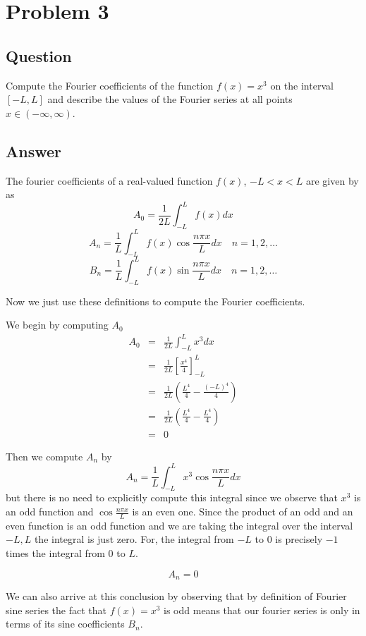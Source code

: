 \documentclass[12pt]{article}
\begin{document}
\section{Problem 3}
\subsection{Question}
Compute the Fourier coefficients of the function $f(x)=x^3$ on the interval $[-L,L]$ and describe the values of the Fourier series at all points $x\in(-\infty,\infty)$.

\subsection{Answer}

The fourier coefficients of a real-valued function $f(x)$, $-L<x<L$ are given by \cite[Page 37]{pinsky} as
\[A_0 = \frac{1}{2 L} \int_{-L}^L f(x) dx \]
\[A_n = \frac{1}{L} \int_{-L}^L f(x) \cos{\frac{n \pi x}{L}} dx \quad  n=1,2,\dots\]
\[B_n = \frac{1}{L} \int_{-L}^L f(x) \sin{\frac{n \pi x}{L}} dx \quad n=1,2,\dots \]

Now we just use these definitions to compute the Fourier coefficients.

We begin by computing $A_0$
\begin{eqnarray*}A_0 &=& \frac{1}{2 L} \int_{-L}^L x^3 dx \\
&=& \frac{1}{2L} \left[\frac{x^4}{4}\right]_{-L}^L \\
&=& \frac{1}{2L} \left(\frac{L^4}{4}-\frac{(-L)^4}{4}\right)\\
&=& \frac{1}{2L} \left(\frac{L^4}{4}-\frac{L^4}{4}\right)\\
&=& 0
\end{eqnarray*}

Then we compute $A_n$ by
\[A_n = \frac{1}{L} \int_{-L}^L x^3 \cos{\frac{n \pi x}{L}} dx 
\]
but there is no need to explicitly compute this integral since we observe that $x^3$ is an odd function and $\cos{\frac{n \pi x}{L}}$ is an even one. Since the product of an odd and an even function is an odd function and we are taking the integral over the interval $-L, L$ the integral is just zero. For, the integral from $-L$ to $0$ is precisely $-1$ times the integral from $0$ to $L$. 

\[A_n=0\]

We can also arrive at this conclusion by observing that by definition of Fourier sine series \cite[Page 42]{pinsky} the fact that $f(x)=x^3$ is odd means that our fourier series is only in terms of its sine coefficients $B_n$.
\end{document}
